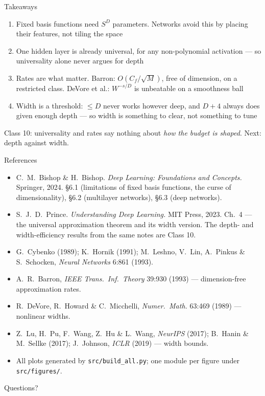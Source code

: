 \documentclass[aspectratio=169, 11pt]{beamer}
\newcommand{\nosrc}{}       %
\begin{document}
\begin{frame}{Takeaways}
  \nosrc
  \vspace{0.1em}
  {\footnotesize
  \begin{enumerate}\setlength{\itemsep}{2pt}
    \item Fixed basis functions need $S^{D}$ parameters. Networks avoid
          this by \alert{placing their features}, not tiling the space
    \item One hidden layer is already universal, for any
          non-polynomial activation --- so \alert{universality alone
          never argues for depth}
    \item Rates are what matter. \alert{Barron}: $O(C_f/\sqrt{M})$,
          free of dimension, on a restricted class.
          \alert{DeVore et al.}: $W^{-s/D}$ is unbeatable on a
          smoothness ball
    \item \alert{Width is a threshold}: $\leq D$ never works however
          deep, and $D+4$ always does given enough depth --- so width
          is something to clear, not something to tune
  \end{enumerate}}
  \vspace{-0.1em}
  \begin{redhighlight}
    {\scriptsize Class 10: universality and rates say nothing about
    \emph{how the budget is shaped}. Next: depth against width.}
  \end{redhighlight}
\end{frame}

\begin{frame}{References}
  \nosrc
  \scriptsize
  \begin{itemize}\setlength{\itemsep}{0pt}
    \item C.~M.~Bishop \& H.~Bishop. \textit{Deep Learning: Foundations
          and Concepts.} Springer, 2024. \S6.1 (limitations of fixed
          basis functions, the curse of dimensionality), \S6.2
          (multilayer networks), \S6.3 (deep networks).
    \item S.~J.~D.~Prince. \textit{Understanding Deep Learning.}
          MIT Press, 2023. Ch.~4 --- the universal approximation
          theorem and its width version. The depth- and
          width-efficiency results from the same notes are Class 10.
    \item G.~Cybenko (1989); K.~Hornik (1991); M.~Leshno, V.~Lin,
          A.~Pinkus \& S.~Schocken, \textit{Neural Networks} 6:861
          (1993).
    \item A.~R.~Barron, \textit{IEEE Trans.\ Inf.\ Theory} 39:930
          (1993) --- dimension-free approximation rates.
    \item R.~DeVore, R.~Howard \& C.~Micchelli, \textit{Numer.\ Math.}
          63:469 (1989) --- nonlinear widths.
    \item Z.~Lu, H.~Pu, F.~Wang, Z.~Hu \& L.~Wang, \textit{NeurIPS}
          (2017); B.~Hanin \& M.~Sellke (2017); J.~Johnson,
          \textit{ICLR} (2019) --- width bounds.
    \item All plots generated by \texttt{src/build\_all.py}; one module
          per figure under \texttt{src/figures/}.
  \end{itemize}
\end{frame}

\begin{frame}[standout]
  \nosrc
  Questions?
\end{frame}
\end{document}

